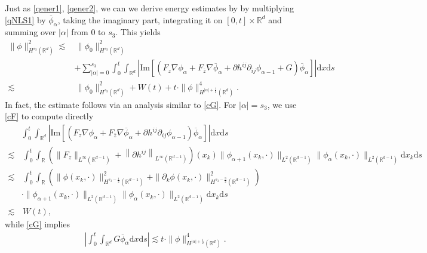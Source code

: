 \documentclass[10pt,twoside,a4paper]{article}
\numberwithin{equation}{section}\allowdisplaybreaks
\begin{document}
Just as \eqref{qener1}, \eqref{qener2}, we can 
 we derive energy estimates by  by multiplying  \eqref{qNLS1}
by
$ \overline{\phi}_{\alpha } $, taking the imaginary part,
integrating it on $  [0,t]\times\mathbb{R}^d  $ and  summing  over $ |\alpha| $ from 0 to $ s_3$.   This yields
\begin{align} \label{cener1}
	\| \phi\|_{H^{ s_3 }(\mathbb{R}^d)}^2\lesssim &\, 		\| \phi_0\|_{H^{s_3 }(\mathbb{R}^d)}^2\nonumber\\
	&+\sum_{|\alpha|=0}^{s_3}\int_0^t\int_{\mathbb{R}^d} \left| \mathrm{Im} \left[  \left(F_z\nabla \phi_\alpha+F_{\overline{z}}\nabla \overline{\phi}_\alpha+\partial h^{ij}\partial_{ij } \phi_{\alpha -1}+G\right)\overline{\phi}_{\alpha }\right]\right| \mathrm{d} x\mathrm{d} s\\
	\lesssim &\,\| \phi_0\|_{H^{s_3 }(\mathbb{R}^d)}^2+W(t)+t\cdot\|\phi\|_{H^{|\alpha|+\frac12}(\mathbb{R}^{d})}^4. \nonumber
\end{align}
In fact,  the estimate follows via an analysis similar to \eqref{cG}.  For $ |\alpha| =s_3 $, we use \eqref{cF} to compute directly
\begin{align}  \label{cener1_c1}
	&\int_0^t\int_{\mathbb{R}^d} \left| \mathrm{Im} \left[  \left(F_z\nabla \phi_\alpha+F_{\overline{z}}\nabla \overline{\phi}_\alpha+\partial h^{ij}\partial_{ij } \phi_{\alpha -1}\right)\overline{\phi}_{\alpha }\right]\right| \mathrm{d} x\mathrm{d} s\\
	\lesssim &\,\int_0^t	\int_{\mathbb{R}}  \left( 	\|F_z\|_{L^\infty(\mathbb{R}^{d-1})}+\left\|	\partial h^{ij} \right\|_{L^\infty(\mathbb{R}^{d-1})}\right) (x_k)\|\phi_{\alpha +1} (x_k,\cdot)\|_{L^{2}(\mathbb{R}^{d-1})} \|\phi_{\alpha } (x_k,\cdot)\|_{L^{2}(\mathbb{R}^{d-1})}\mathrm{d} x_k \mathrm{d} s\nonumber\\
	\lesssim &\,\int_0^t	\int_{\mathbb{R}}  \left(  \|\phi(x_k,\cdot)\|_{H^{s_3-\frac 12}(\mathbb{R}^{d-1})}^2+\|\partial_k \phi(x_k,\cdot)\|_{H^{s_3-\frac 32}(\mathbb{R}^{d-1})}^2\right) \nonumber\\
	&\cdot\|\phi_{\alpha +1} (x_k,\cdot)\|_{L^{2}(\mathbb{R}^{d-1})}\|\phi_{\alpha } (x_k,\cdot)\|_{L^{2}(\mathbb{R}^{d-1})}\mathrm{d} x_k \mathrm{d} s \nonumber\\
	\lesssim &\,W(t),\nonumber
\end{align}
while  \eqref{cG}  implies 
\begin{align} \label{cener1_c2}
	\left|\int_0^t\int_{\mathbb{R}^d}  G\overline{\phi}_{\alpha } \mathrm{d} x\mathrm{d} s\right|\lesssim t\cdot\|\phi\|_{H^{|\alpha|+\frac12}(\mathbb{R}^{d})}^4.
\end{align}
\end{document}
